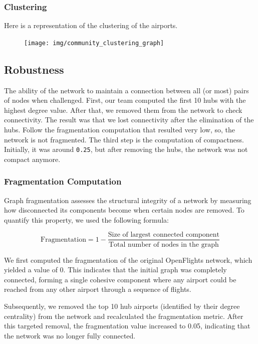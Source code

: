 \documentclass[12pt]{article}
\begin{document}
    \subsubsection{Clustering}
    Here is a representation of the clustering of the airports.

    \begin{figure}[H]
        \centering
        \texttt{[image: img/community\_clustering\_graph]}
    \end{figure}

    \subsection{Robustness}\label{subsec:robustness}
    The ability of the network to maintain a connection between all (or most) pairs of nodes when challenged. First, our team computed the first 10 hubs with the highest degree value. After that, we removed them from the network to check connectivity. The result was that we lost connectivity after the elimination of the hubs. Follow the fragmentation computation that resulted very low, so, the network is not fragmented. The third step is the computation of compactness. Initially, it was around \texttt{0.25}, but after removing the hubs, the network was not compact anymore.

    \subsubsection{Fragmentation Computation}
    Graph fragmentation assesses the structural integrity of a network by measuring how disconnected its components become when certain nodes are removed. To quantify this property, we used the following formula:
    
    \begin{equation}
        \text{Fragmentation} = 1 - \frac{\text{Size of largest connected component}}{\text{Total number of nodes in the graph}}
    \end{equation}
    
    We first computed the fragmentation of the original OpenFlights network, which yielded a value of 0. This indicates that the initial graph was completely connected, forming a single cohesive component where any airport could be reached from any other airport through a sequence of flights.
    
    Subsequently, we removed the top 10 hub airports (identified by their degree centrality) from the network and recalculated the fragmentation metric. After this targeted removal, the fragmentation value increased to 0.05, indicating that the network was no longer fully connected.
    
\end{document}
